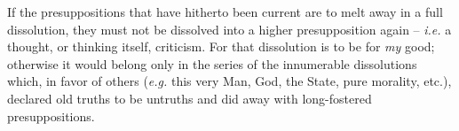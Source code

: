 If the presuppositions that have hitherto been current are to melt away in a 
full dissolution, they must not be dissolved into a higher presupposition 
again -- \textit{i.e.} a thought, or thinking itself, criticism. For that 
dissolution is to be for \textit{my} good; otherwise it would belong only in 
the series of the innumerable dissolutions which, in favor of others 
(\textit{e.g.} this very Man, God, the State, pure morality, etc.), declared 
old truths to be untruths and did away with long-fostered presuppositions.
